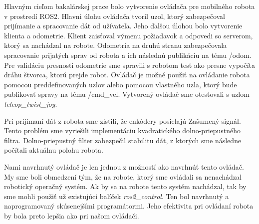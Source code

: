 
Hlavným cieľom bakalárskej prace bolo vytvorenie ovládača pre mobilného robota v prostredí ROS2. Hlavni úlohu
ovládača tvoril uzol, ktorý zabezpečoval prijímanie a spracovanie dát od užívateľa. Jeho ďalšou úlohou bolo vytvorenie
klienta a odometrie. Klient zaisťoval výmenu požiadavok a odpovedi so serverom, ktorý sa nachádzal na robote. Odometria
na druhú stranu zabezpečovala spracovanie prijatých sprav od robota a ich následnú publikáciu na tému /odom. Pre
validáciu presnosti odometrie sme spravili s robotom test ako presne vypočíta dráhu štvorca, ktorú prejde robot.
Ovládač je možné použiť na ovládanie robota pomocou preddefinovaných uzlov alebo pomocou vlastného uzla, ktorý
bude publikovať spravy na tému /cmd\_vel. Vytvorený ovládač sme otestovali s uzlom \textit{teleop\_twist\_joy}.

Pri prijímaní dát z robota sme zistili, že enkódery posielajú Zašumený signál. Tento problém sme vyriešili implementáciu
kvadratického dolno-priepustného filtra. Dolno-priepustný filter zabezpečil stabilitu dát, z ktorých sme následne počítali
aktuálnu polohu robota.

Nami navrhnutý ovládač je len jednou z možností ako navrhnúť tento ovládač. My sme boli obmedzení tým, že na robote,
ktorý sme ovládali sa nenachádzal robotický operačný systém. Ak by sa na robote tento systém nachádzal, tak by sme mohli
použiť už existujúci balíček \textit{ros2\_control}. Ten bol navrhnutý a naprogramovaný skúsenejšími programátormi.
Jeho efektivita pri ovládaní robota by bola preto lepšia ako pri našom ovládači.

